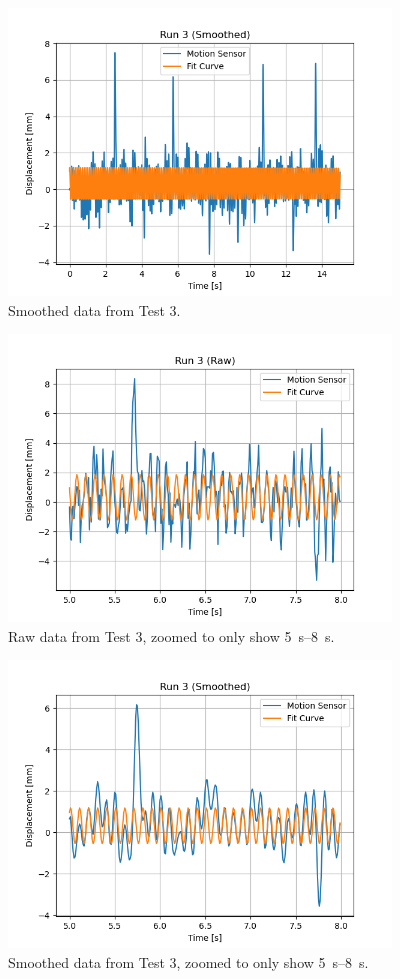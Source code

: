 \documentclass[12 pt]{report}
\begin{document}
\begin{figure}[htbp]
\centering
\includegraphics[width=4in]{images/Graphs/Run_3-Smoothed}
\caption{Smoothed data from Test \num{3}.}
\end{figure}

\begin{figure}[htbp]
\centering
\includegraphics[width=4in]{images/Graphs/Run_3-Raw-Zoomed}
\caption{Raw data from Test \num{3}, zoomed to only show \qtyrange{5}{8}{\s}.}
\end{figure}

\begin{figure}[htbp]
\centering
\includegraphics[width=4in]{images/Graphs/Run_3-Smoothed-Zoomed}
\caption{Smoothed data from Test \num{3}, zoomed to only show \qtyrange{5}{8}{\s}.}
\end{figure}
\end{document}
